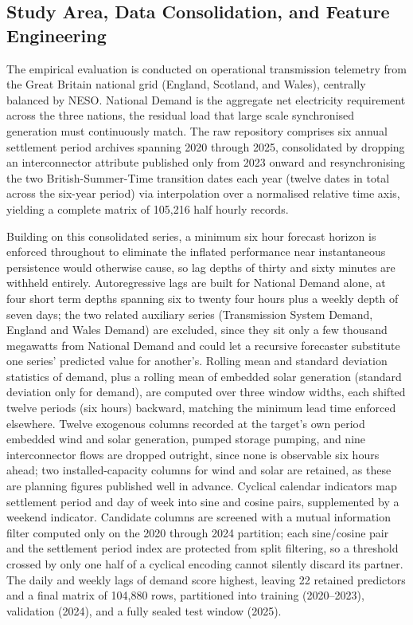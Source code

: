 \documentclass[runningheads]{llncs}
\begin{document}
\subsection{Study Area, Data Consolidation, and Feature Engineering}
\label{sec:featureeng}

The empirical evaluation is conducted on operational transmission telemetry from the Great Britain national grid (England, Scotland, and Wales), centrally balanced by NESO. National Demand is the aggregate net electricity requirement across the three nations, the residual load that large scale synchronised generation must continuously match. The raw repository comprises six annual settlement period archives spanning 2020 through 2025, consolidated by dropping an interconnector attribute published only from 2023 onward and resynchronising the two British-Summer-Time transition dates each year (twelve dates in total across the six-year period) via interpolation over a normalised relative time axis, yielding a complete matrix of 105{,}216 half hourly records.

Building on this consolidated series, a minimum six hour forecast horizon is enforced throughout to eliminate the inflated performance near instantaneous persistence would otherwise cause, so lag depths of thirty and sixty minutes are withheld entirely. Autoregressive lags are built for National Demand alone, at four short term depths spanning six to twenty four hours plus a weekly depth of seven days; the two related auxiliary series (Transmission System Demand, England and Wales Demand) are excluded, since they sit only a few thousand megawatts from National Demand and could let a recursive forecaster substitute one series' predicted value for another's. Rolling mean and standard deviation statistics of demand, plus a rolling mean of embedded solar generation (standard deviation only for demand), are computed over three window widths, each shifted twelve periods (six hours) backward, matching the minimum lead time enforced elsewhere. Twelve exogenous columns recorded at the target's own period embedded wind and solar generation, pumped storage pumping, and nine interconnector flows are dropped outright, since none is observable six hours ahead; two installed-capacity columns for wind and solar are retained, as these are planning figures published well in advance. Cyclical calendar indicators map settlement period and day of week into sine and cosine pairs, supplemented by a weekend indicator. Candidate columns are screened with a mutual information filter computed only on the 2020 through 2024 partition; each sine/cosine pair and the settlement period index are protected from split filtering, so a threshold crossed by only one half of a cyclical encoding cannot silently discard its partner. The daily and weekly lags of demand score highest, leaving 22 retained predictors and a final matrix of 104{,}880 rows, partitioned into training (2020--2023), validation (2024), and a fully sealed test window (2025).
\end{document}
